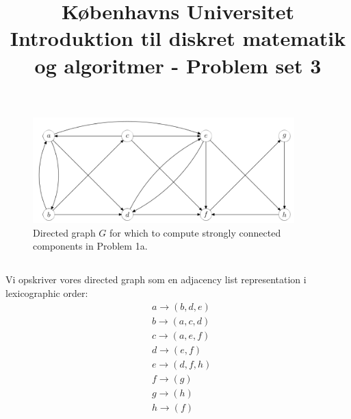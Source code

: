 \documentclass[a4paper,12pt]{article}
\begin{document}
% 

\title{Københavns Universitet\\
Introduktion til diskret matematik og algoritmer - Problem set 3}
\maketitle %



\section[Question 1]{}
\begin{figure}[H]
    \centering
    \includegraphics[width=0.9\textwidth]{1.png}
    \caption{Directed graph $G$ for which to compute strongly connected components in Problem 1a.}
\end{figure}

\subsection[]{}
Vi opskriver vores directed graph som en adjacency list representation i lexicographic order:
\[
\begin{aligned}
&a \rightarrow (b, d, e)\\
&b \rightarrow (a, c, d)\\
&c \rightarrow (a, e, f)\\
&d \rightarrow (e, f)\\
&e \rightarrow (d, f, h)\\
&f \rightarrow (g)\\
&g \rightarrow (h)\\
&h \rightarrow (f)\\
\end{aligned}
\]
\end{document}
